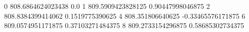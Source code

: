 0 808.6864624023438 0.0
1 809.5909423828125 0.90447998046875
2 808.8384399414062 0.1519775390625
4 808.351806640625 -0.33465576171875
6 809.0574951171875 0.37103271484375
8 809.2733154296875 0.58685302734375

